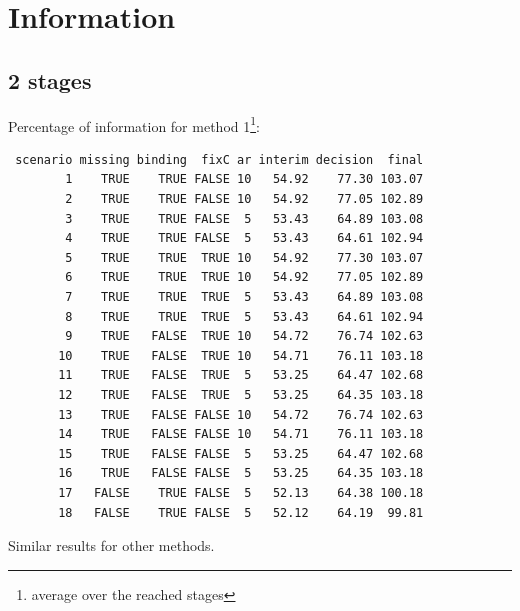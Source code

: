 \documentclass[12pt]{article}
\begin{document}
\clearpage

\section{Information}
\label{sec:org3b3b288}

\subsection{2 stages}
\label{sec:org6c70a47}
Percentage of information for method 1\footnote{average over the reached stages}:
\begin{verbatim}
 scenario missing binding  fixC ar interim decision  final
        1    TRUE    TRUE FALSE 10   54.92    77.30 103.07
        2    TRUE    TRUE FALSE 10   54.92    77.05 102.89
        3    TRUE    TRUE FALSE  5   53.43    64.89 103.08
        4    TRUE    TRUE FALSE  5   53.43    64.61 102.94
        5    TRUE    TRUE  TRUE 10   54.92    77.30 103.07
        6    TRUE    TRUE  TRUE 10   54.92    77.05 102.89
        7    TRUE    TRUE  TRUE  5   53.43    64.89 103.08
        8    TRUE    TRUE  TRUE  5   53.43    64.61 102.94
        9    TRUE   FALSE  TRUE 10   54.72    76.74 102.63
       10    TRUE   FALSE  TRUE 10   54.71    76.11 103.18
       11    TRUE   FALSE  TRUE  5   53.25    64.47 102.68
       12    TRUE   FALSE  TRUE  5   53.25    64.35 103.18
       13    TRUE   FALSE FALSE 10   54.72    76.74 102.63
       14    TRUE   FALSE FALSE 10   54.71    76.11 103.18
       15    TRUE   FALSE FALSE  5   53.25    64.47 102.68
       16    TRUE   FALSE FALSE  5   53.25    64.35 103.18
       17   FALSE    TRUE FALSE  5   52.13    64.38 100.18
       18   FALSE    TRUE FALSE  5   52.12    64.19  99.81
\end{verbatim}

Similar results for other methods.
\end{document}
